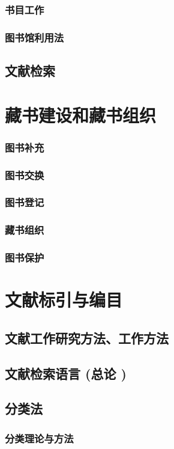 \documentclass[UTF8]{../../ApplicationUniverse}
\begin{document}
        \subsubsection{书目工作}
        \subsubsection{图书馆利用法}
    \subsection{文献检索}

\section{藏书建设和藏书组织}
    \subsubsection{图书补充}
    \subsubsection{图书交换}
    \subsubsection{图书登记}
    \subsubsection{藏书组织}
    \subsubsection{图书保护}

\section{文献标引与编目}
    \subsection{文献工作研究方法、工作方法}
    \subsection{文献检索语言 (总论 )}
    \subsection{分类法}
        \subsubsection{分类理论与方法}
\end{document}
